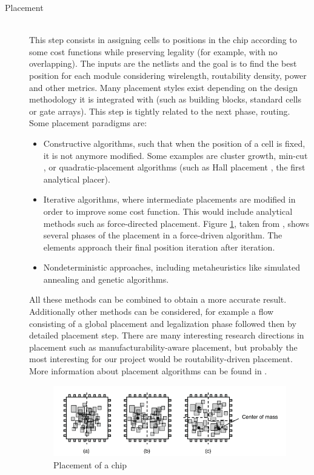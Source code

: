 \begin{description}
  \item[Placement] \hfill \\
  This step consists in assigning cells to positions in the chip according to some cost functions while preserving legality (for example, with no overlapping). The inputs are the netlists and the goal is to find the best position for each module considering wirelength, routability density, power and other metrics. Many placement styles exist depending on the design methodology it is integrated with (such as building blocks, standard cells or gate arrays). This step is tightly related to the next phase, routing. Some placement paradigms are:
  
	\begin{itemize}
 	 \item Constructive algorithms, such that when the position of a cell is fixed, it is not anymore modified. Some examples are cluster growth, min-cut \cite{placementprocedure}, or quadratic-placement algorithms (such as Hall placement \cite{hallplacer}, the first analytical placer).
 	 \item Iterative algorithms, where intermediate placements are modified in order to improve some cost function. This would include analytical methods such as force-directed placement. Figure \ref{fig:placement}, taken from \cite{changcheng}, shows several phases of the placement in a force-driven algorithm. The elements approach their final position iteration after iteration.
 	 \item Nondeterministic approaches, including metaheuristics like simulated annealing and genetic algorithms.
	\end{itemize}
	
  All these methods can be combined to obtain a more accurate result. Additionally other methods can be considered, for example a flow consisting of a global placement and legalization phase followed then by detailed placement step. There are many interesting research directions in placement such as manufacturability-aware placement, but probably the most interesting for our project would be routability-driven placement\cite{routabilitydrivenplacement}. More information about placement algorithms can be found in \cite{partitionchapter}.
  
\begin{figure}[h!]
  \centering
  \includegraphics[scale=0.6]{img/bckgrnd/placement.png}
  \caption{Placement of a chip}
  \label{fig:placement}
\end{figure} 


\end{description}

